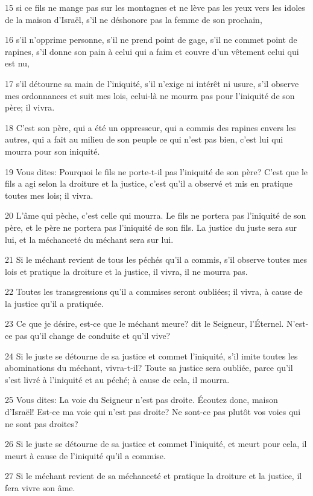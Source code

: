\par 15 si ce fils ne mange pas sur les montagnes et ne lève pas les yeux vers les idoles de la maison d'Israël, s'il ne déshonore pas la femme de son prochain,
\par 16 s'il n'opprime personne, s'il ne prend point de gage, s'il ne commet point de rapines, s'il donne son pain à celui qui a faim et couvre d'un vêtement celui qui est nu,
\par 17 s'il détourne sa main de l'iniquité, s'il n'exige ni intérêt ni usure, s'il observe mes ordonnances et suit mes lois, celui-là ne mourra pas pour l'iniquité de son père; il vivra.
\par 18 C'est son père, qui a été un oppresseur, qui a commis des rapines envers les autres, qui a fait au milieu de son peuple ce qui n'est pas bien, c'est lui qui mourra pour son iniquité.
\par 19 Vous dites: Pourquoi le fils ne porte-t-il pas l'iniquité de son père? C'est que le fils a agi selon la droiture et la justice, c'est qu'il a observé et mis en pratique toutes mes lois; il vivra.
\par 20 L'âme qui pèche, c'est celle qui mourra. Le fils ne portera pas l'iniquité de son père, et le père ne portera pas l'iniquité de son fils. La justice du juste sera sur lui, et la méchanceté du méchant sera sur lui.
\par 21 Si le méchant revient de tous les péchés qu'il a commis, s'il observe toutes mes lois et pratique la droiture et la justice, il vivra, il ne mourra pas.
\par 22 Toutes les transgressions qu'il a commises seront oubliées; il vivra, à cause de la justice qu'il a pratiquée.
\par 23 Ce que je désire, est-ce que le méchant meure? dit le Seigneur, l'Éternel. N'est-ce pas qu'il change de conduite et qu'il vive?
\par 24 Si le juste se détourne de sa justice et commet l'iniquité, s'il imite toutes les abominations du méchant, vivra-t-il? Toute sa justice sera oubliée, parce qu'il s'est livré à l'iniquité et au péché; à cause de cela, il mourra.
\par 25 Vous dites: La voie du Seigneur n'est pas droite. Écoutez donc, maison d'Israël! Est-ce ma voie qui n'est pas droite? Ne sont-ce pas plutôt vos voies qui ne sont pas droites?
\par 26 Si le juste se détourne de sa justice et commet l'iniquité, et meurt pour cela, il meurt à cause de l'iniquité qu'il a commise.
\par 27 Si le méchant revient de sa méchanceté et pratique la droiture et la justice, il fera vivre son âme.
